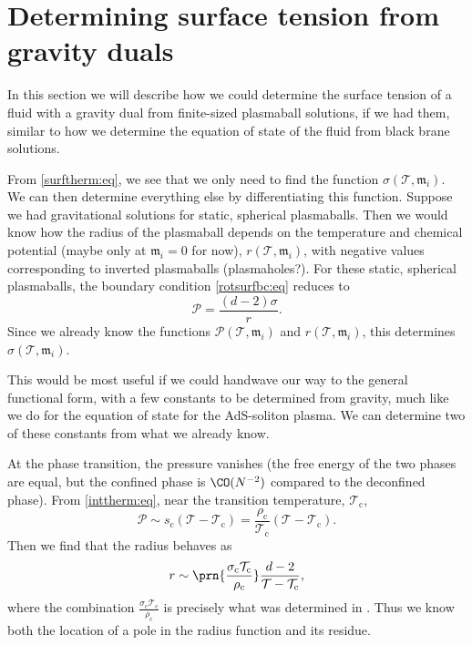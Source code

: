 \documentclass[12pt]{article}
\newcommand{\tloc}{\mathcal{T}}
\newcommand{\ploc}{\mathcal{P}}
\newcommand{\ml}{\mathfrak{m}}
\newcommand{\tc}{\mathcal{T_\mathrm{c}}}
\newcommand{\rc}{\rho_\mathrm{c}}
\newcommand{\ec}{s_\mathrm{c}}
\newcommand{\sic}{\sigma_\mathrm{c}}
\begin{document}

\section{Determining surface tension from gravity duals}\label{sec:fromgravity}

In this section we will describe how we could determine the surface tension of a fluid with a gravity dual from finite-sized plasmaball solutions, if we had them, similar to how we determine the equation of state of the fluid from black brane solutions.

From \eqref{surftherm:eq}, we see that we only need to find the function $\sigma(\tloc,\ml_i)$.
We can then determine everything else by differentiating this function.
Suppose we had gravitational solutions for static, spherical plasmaballs.
Then we would know how the radius of the plasmaball depends on the temperature and chemical potential (maybe only at $\ml_i=0$ for now), $r(\tloc,\ml_i)$, with negative values corresponding to inverted plasmaballs (plasmaholes?).
For these static, spherical plasmaballs, the boundary condition \eqref{rotsurfbc:eq} reduces to
%
\begin{equation}\label{eq:staticbc}
  \ploc = \frac{(d-2)\sigma}{r}.
\end{equation}
%
Since we already know the functions $\ploc(\tloc,\ml_i)$ and $r(\tloc,\ml_i)$, this determines $\sigma(\tloc,\ml_i)$.

This would be most useful if we could handwave our way to the general functional form, with a few constants to be determined from gravity, much like we do for the equation of state for the AdS-soliton plasma.
We can determine two of these constants from what we already know.

At the phase transition, the pressure vanishes (the free energy of the two phases are equal, but the confined phase is $\CO(N^{-2})$ compared to the deconfined phase).
From \eqref{inttherm:eq}, near the transition temperature, $\tc$,
%
\begin{equation}\label{eq:neartc}
  \ploc \sim \ec(\tloc-\tc) = \frac{\rc}{\tc}(\tloc-\tc).
\end{equation}
%
Then we find that the radius behaves as
%
\begin{equation}\label{eqradiustc}
  r \sim \prn{\frac{\sic\tc}{\rc}}\frac{d-2}{\tloc-\tc}, 
\end{equation}
%
where the combination $\frac{\sic\tc}{\rc}$ is precisely what was determined in \cite{Aharony:2005bm}.
Thus we know both the location of a pole in the radius function and its residue.
\end{document}
